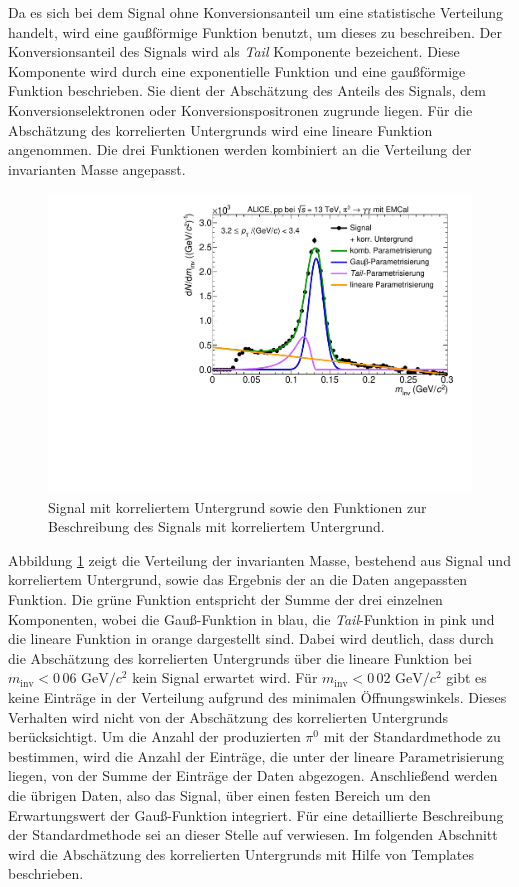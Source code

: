 Da es sich bei dem Signal ohne Konversionsanteil um eine statistische Verteilung handelt, wird eine gaußförmige Funktion benutzt, um dieses zu beschreiben.
\newline
Der Konversionsanteil des Signals wird als \textit{Tail} Komponente bezeichent.
Diese Komponente wird durch eine exponentielle Funktion und eine gaußförmige Funktion beschrieben.
Sie dient der Ab\-schät\-zung des Anteils des Signals, dem Konversionselektronen oder Konversionspositronen zugrunde liegen.
Für die Abschätzung des korrelierten Untergrunds wird eine lineare Funktion angenommen.
Die drei Funktionen werden kombiniert an die Verteilung der invarianten Masse angepasst.
\begin{figure}[tp]
\centering
\includegraphics[width=.75\linewidth]{StandardParam.pdf}
\caption{Signal mit korreliertem Untergrund sowie den Funktionen zur Beschreibung des Signals mit korreliertem Untergrund.}
\label{figStandardParam}
\end{figure}
\newline
Abbildung \ref{figStandardParam} zeigt die Verteilung der invarianten Masse, bestehend aus Signal und korreliertem Untergrund, sowie das Ergebnis der an die Daten angepassten Funktion.
Die grüne Funktion entspricht der Summe der drei einzelnen Komponenten, wobei die Gauß-Funktion in blau, die \textit{Tail}-Funktion in pink und die lineare Funktion in orange dargestellt sind.
Dabei wird deutlich, dass durch die Abschätzung des korrelierten Untergrunds über die lineare Funktion bei $m_\text{inv} < 0\,06\text{ GeV}/c^{2}$ kein Signal erwartet wird.
Für $m_\text{inv} < 0\,02\text{ GeV}/c^{2}$ gibt es keine Einträge in der Verteilung aufgrund des minimalen Öffnungswinkels.
Dieses Verhalten wird nicht von der Abschätzung des korrelierten Untergrunds berücksichtigt.
\newline
Um die Anzahl der produzierten $\pi^{0}$ mit der Standardmethode zu bestimmen, wird die Anzahl der Einträge, die unter der lineare Parametrisierung liegen, von der Summe der Einträge der Daten abgezogen.
Anschließend werden die übrigen Daten, also das Signal, über einen festen Bereich um den Erwartungswert der Gauß-Funktion integriert.
Für eine detaillierte Beschreibung der Standardmethode sei an dieser Stelle auf \cite{thesis:Adrian} verwiesen.
\newline
Im folgenden Abschnitt wird die Abschätzung des korrelierten Untergrunds mit Hilfe von Templates beschrieben.